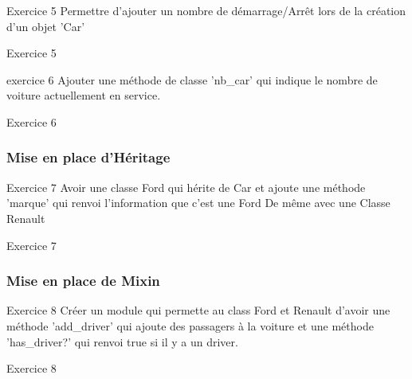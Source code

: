 \documentclass{beamer}
\begin{document}
\begin{frame}
  \begin{block}{Exercice 5}
  Permettre d'ajouter un nombre de d\'emarrage/Arrêt lors de la cr\'eation
  d'un objet 'Car'
\end{block}
\end{frame}
\begin{frame}
  \begin{beamerboxesrounded}{Exercice 5}
    
  \end{beamerboxesrounded}
\end{frame}

\begin{frame}
  \begin{block}{exercice 6}
  Ajouter une m\'ethode de classe 'nb\_car' qui indique le nombre de voiture actuellement en
  service.
\end{block}
\end{frame}
\begin{frame}
  \begin{beamerboxesrounded}{Exercice 6}
    
  \end{beamerboxesrounded}
\end{frame}

\begin{frame}
  \frametitle{Mise en place d'H\'eritage}
  \begin{block}{Exercice 7}
  Avoir une classe Ford qui h\'erite de Car et ajoute une m\'ethode 'marque' qui renvoi l'information que c'est une Ford
  De même avec une Classe Renault
\end{block}
\end{frame}

\begin{frame}
  \begin{beamerboxesrounded}{Exercice 7}
    
  \end{beamerboxesrounded}
\end{frame}

\begin{frame}
  \frametitle{Mise en place de Mixin}
  \begin{block}{Exercice 8}
  Cr\'eer un module qui permette au class Ford et Renault d'avoir une m\'ethode 'add\_driver'
  qui ajoute des passagers à la voiture et une m\'ethode 'has\_driver?' qui renvoi true si il y a un driver.
\end{block}
\end{frame}
\begin{frame}
  \begin{beamerboxesrounded}{Exercice 8}
    
  \end{beamerboxesrounded}
\end{frame}
\end{document}
